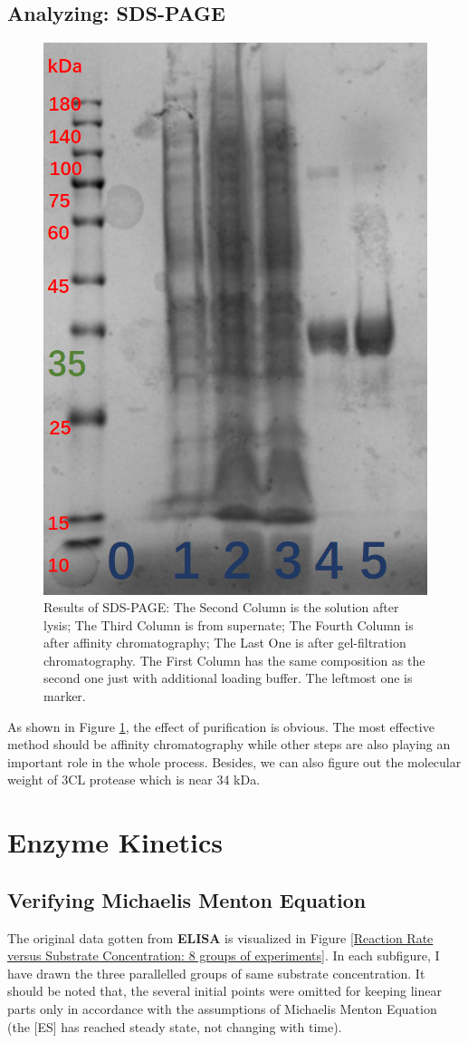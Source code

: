 \documentclass{report}
\begin{document}
\subsection{Analyzing: SDS-PAGE}
\begin{figure}
    \centering
    \includegraphics[width=0.7\linewidth]{../Figures/SDS-PAGE.png}
    \caption{Results of SDS-PAGE: The Second Column is the solution after lysis; The Third Column is from supernate; The Fourth Column is after affinity chromatography; The Last One is after gel-filtration chromatography. The First Column has the same composition as the second one just with additional loading buffer. The leftmost one is marker.}
    \label{Results of SDS-PAGE}
\end{figure}
As shown in Figure \ref{Results of SDS-PAGE}, the effect of purification is obvious.
The most effective method should be affinity chromatography while other steps are also playing an important role in the whole process.
Besides, we can also figure out the molecular weight of 3CL protease which is near 34 kDa.

\section{Enzyme Kinetics}
\subsection{Verifying Michaelis Menton Equation}
The original data gotten from \textbf{ELISA} is visualized in Figure \ref{Reaction Rate versus Substrate Concentration: 8 groups of experiments}.
In each subfigure, I have drawn the three parallelled groups of same substrate concentration.
It should be noted that, the several initial points were omitted for keeping linear parts only in accordance with the assumptions of Michaelis Menton Equation (the [ES] has reached steady state, not changing with time).
\end{document}
